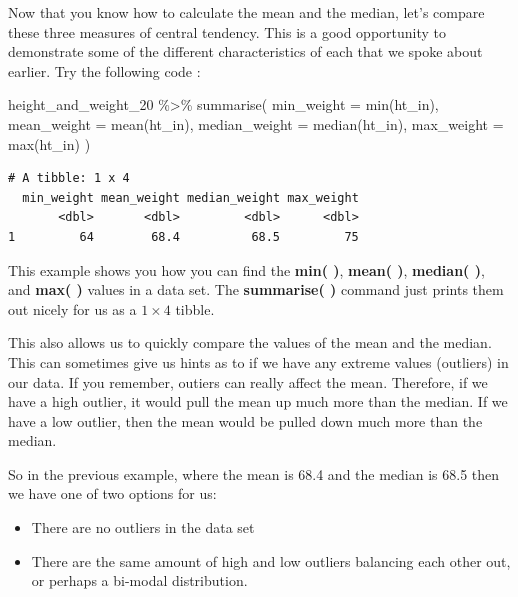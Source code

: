 \documentclass[
  letterpaper,
  DIV=11,
  numbers=noendperiod]{scrreprt}
\newenvironment{Shaded}{\begin{snugshade}}{\end{snugshade}}
\newcommand{\AttributeTok}[1]{\textcolor[rgb]{0.40,0.45,0.13}{#1}}
\newcommand{\FunctionTok}[1]{\textcolor[rgb]{0.28,0.35,0.67}{#1}}
\newcommand{\NormalTok}[1]{\textcolor[rgb]{0.00,0.23,0.31}{#1}}
\newcommand{\SpecialCharTok}[1]{\textcolor[rgb]{0.37,0.37,0.37}{#1}}
\providecommand{\tightlist}{%
  \setlength{\itemsep}{0pt}\setlength{\parskip}{0pt}}\usepackage{longtable,booktabs,array}
\begin{document}

Now that you know how to calculate the mean and the median, let's
compare these three measures of central tendency. This is a good
opportunity to demonstrate some of the different characteristics of each
that we spoke about earlier. Try the following code :

\begin{Shaded}
\begin{Highlighting}[]
\NormalTok{height\_and\_weight\_20 }\SpecialCharTok{\%\textgreater{}\%} 
  \FunctionTok{summarise}\NormalTok{(}
    \AttributeTok{min\_weight    =} \FunctionTok{min}\NormalTok{(ht\_in),}
    \AttributeTok{mean\_weight   =} \FunctionTok{mean}\NormalTok{(ht\_in),}
    \AttributeTok{median\_weight =} \FunctionTok{median}\NormalTok{(ht\_in),}
    \AttributeTok{max\_weight    =} \FunctionTok{max}\NormalTok{(ht\_in)}
\NormalTok{  )}
\end{Highlighting}
\end{Shaded}

\begin{verbatim}
# A tibble: 1 x 4
  min_weight mean_weight median_weight max_weight
       <dbl>       <dbl>         <dbl>      <dbl>
1         64        68.4          68.5         75
\end{verbatim}

This example shows you how you can find the \textbf{min( )},
\textbf{mean( )}, \textbf{median( )}, and \textbf{max( )} values in a
data set. The \textbf{summarise( )} command just prints them out nicely
for us as a \(1 \times 4\) tibble.

This also allows us to quickly compare the values of the mean and the
median. This can sometimes give us hints as to if we have any extreme
values (outliers) in our data. If you remember, outiers can really
affect the mean. Therefore, if we have a high outlier, it would pull the
mean up much more than the median. If we have a low outlier, then the
mean would be pulled down much more than the median.

So in the previous example, where the mean is 68.4 and the median is
68.5 then we have one of two options for us:

\begin{itemize}
\tightlist
\item
  There are no outliers in the data set
\item
  There are the same amount of high and low outliers balancing each
  other out, or perhaps a bi-modal distribution.
\end{itemize}
\end{document}
